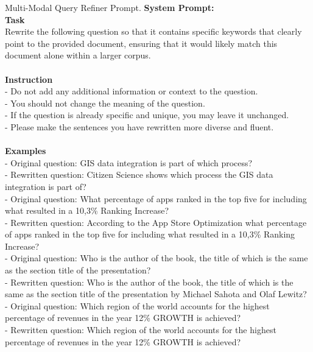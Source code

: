 \begin{figure*}[!ht] 
\begin{AIbox}{Multi-Modal Query Refiner Prompt.}
{\color{black}\bf \large System Prompt:} 
\vspace{1mm}
\\
\textbf{Task}  \\
Rewrite the following question so that it contains specific keywords that clearly point to the provided document, ensuring that it would likely match this document alone within a larger corpus.\\
\\
\textbf{Instruction}\\
- Do not add any additional information or context to the question.\\
- You should not change the meaning of the question.\\
- If the question is already specific and unique, you may leave it unchanged.\\
- Please make the sentences you have rewritten more diverse and fluent. \\
\\
\textbf{Examples}\\
- Original question: GIS data integration is part of which process?\\
- Rewritten question: Citizen Science shows which process the GIS data integration is part of?\\

- Original question: What percentage of apps ranked in the top five for including what resulted in a 10,3\% Ranking Increase?\\
- Rewritten question: According to the App Store Optimization what percentage of apps ranked in the top five for including what resulted in a 10,3\% Ranking Increase?\\

- Original question: Who is the author of the book, the title of which is the same as the section title of the presentation?\\
- Rewritten question: Who is the author of the book, the title of which is the same as the section title of the presentation by Michael Sahota and Olaf Lewitz?\\

- Original question: Which region of the world accounts for the highest percentage of revenues in the year 12\% GROWTH is achieved?\\
- Rewritten question: Which region of the world accounts for the highest percentage of revenues in the year 12\% GROWTH is achieved?\\


\end{AIbox}
\end{figure*}
